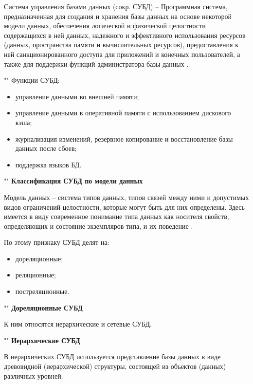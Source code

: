 \documentclass[a4paper]{bmstu}
\begin{document}
Система управления базами данных (сокр. СУБД) -- Программная система, предназначенная для создания и хранения базы данных на основе некоторой модели данных, обеспечения логической и физической целостности содержащихся в ней данных, надежного и эффективного использования ресурсов (данных, пространства памяти и вычислительных ресурсов), предоставления к ней санкционированного доступа для приложений и конечных пользователей, а также для поддержки 
функций администратора базы данных \cite{kogal}.

""\newline
Функции СУБД:

\begin{itemize}
	\setlength\itemsep{0.01em}
	\item управление данными во внешней памяти;
	\item управление данными в оперативной памяти с использованием дискового кэша;
	\item журнализация изменений, резервное копирование и восстановление базы данных после сбоев;
	\item поддержка языков БД.
\end{itemize}

""\newline
\noindent\textbf{Классификация СУБД по модели данных}

Модель данных --  система типов данных, типов связей между ними и допустимых видов ограничений целостности, которые могут быть для них определены. Здесь имеется в виду современное понимание типа данных как носителя свойств, определяющих и состояние экземпляров типа, и их поведение \cite{kogal}.

По этому признаку СУБД делят на:

\begin{itemize}
	\setlength\itemsep{0.01em}
	\item дореляционные;
	\item реляционные;
	\item постреляционные.
\end{itemize}


""\newline
\noindent\textbf{Дореляционные СУБД}

К ним относятся иерархические и сетевые СУБД.

""\newline
\noindent\textbf{Иерархические СУБД}

В иерархических СУБД используется представление базы данных в виде древовидной (иерархической) структуры, состоящей из объектов (данных) различных уровней.
\end{document}
